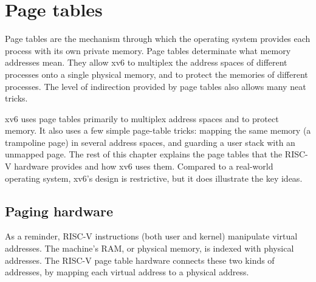 \chapter{Page tables}
\label{CH:MEM}

Page tables are the mechanism through which the operating system
provides each process with its own private memory.  Page tables
determinate what memory addresses mean.  They allow xv6 to multiplex
the address spaces of different processes onto a single physical
memory, and to protect the memories of different processes.  The level
of indirection provided by page tables also allows many neat tricks.

xv6 uses page tables primarily to multiplex address spaces and to
protect memory.  It also uses a few simple page-table tricks: mapping
the same memory (a trampoline page) in several address spaces, and
guarding a user stack with an unmapped page.  The rest of this chapter
explains the page tables that the RISC-V hardware provides and how xv6
uses them.  Compared to a real-world operating system, xv6's design is
restrictive, but it does illustrate the key ideas.
\section{Paging hardware}
As a reminder,
RISC-V instructions (both user and kernel) manipulate virtual addresses.
The machine's RAM, or physical memory, is indexed with physical
addresses.
The RISC-V page table hardware connects these two kinds of addresses,
by mapping each virtual address to a physical address.

